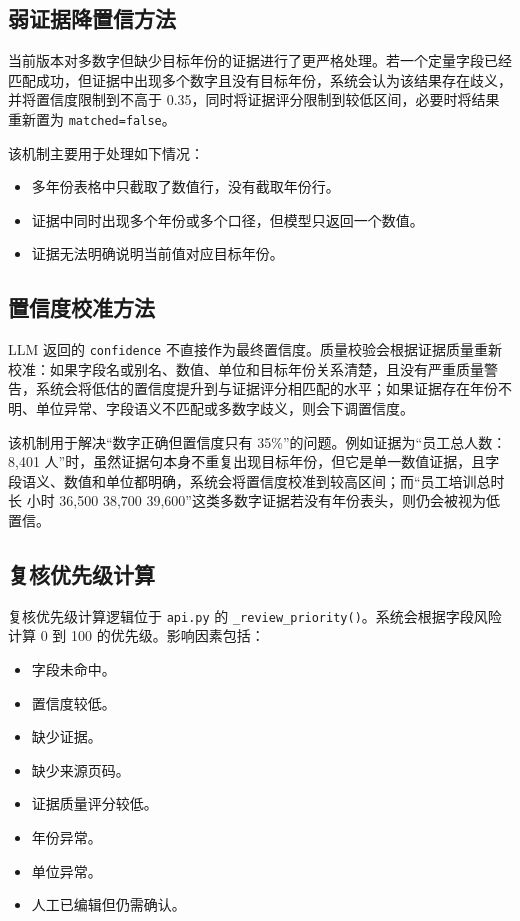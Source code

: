 \documentclass[UTF8,a4paper,12pt]{ctexart}
\begin{document}
\subsection{弱证据降置信方法}

当前版本对多数字但缺少目标年份的证据进行了更严格处理。若一个定量字段已经匹配成功，但证据中出现多个数字且没有目标年份，系统会认为该结果存在歧义，并将置信度限制到不高于 0.35，同时将证据评分限制到较低区间，必要时将结果重新置为 \texttt{matched=false}。

该机制主要用于处理如下情况：

\begin{itemize}
  \item 多年份表格中只截取了数值行，没有截取年份行。
  \item 证据中同时出现多个年份或多个口径，但模型只返回一个数值。
  \item 证据无法明确说明当前值对应目标年份。
\end{itemize}

\subsection{置信度校准方法}

LLM 返回的 \texttt{confidence} 不直接作为最终置信度。质量校验会根据证据质量重新校准：如果字段名或别名、数值、单位和目标年份关系清楚，且没有严重质量警告，系统会将低估的置信度提升到与证据评分相匹配的水平；如果证据存在年份不明、单位异常、字段语义不匹配或多数字歧义，则会下调置信度。

该机制用于解决“数字正确但置信度只有 35\%”的问题。例如证据为“员工总人数：8,401 人”时，虽然证据句本身不重复出现目标年份，但它是单一数值证据，且字段语义、数值和单位都明确，系统会将置信度校准到较高区间；而“员工培训总时长 小时 36,500 38,700 39,600”这类多数字证据若没有年份表头，则仍会被视为低置信。

\subsection{复核优先级计算}

复核优先级计算逻辑位于 \texttt{api.py} 的 \texttt{\_review\_priority()}。系统会根据字段风险计算 0 到 100 的优先级。影响因素包括：

\begin{itemize}
  \item 字段未命中。
  \item 置信度较低。
  \item 缺少证据。
  \item 缺少来源页码。
  \item 证据质量评分较低。
  \item 年份异常。
  \item 单位异常。
  \item 人工已编辑但仍需确认。
\end{itemize}
\end{document}
